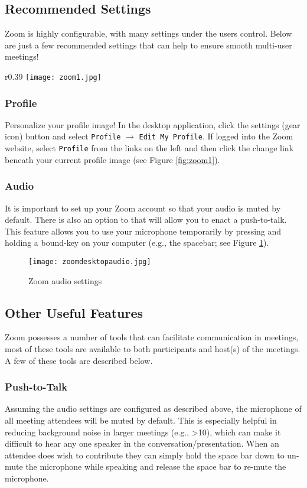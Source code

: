 \subsection{Recommended Settings}
Zoom is highly configurable, with many settings under the users control. Below are just a few recommended settings that can help to ensure smooth multi-user meetings!

    \begin{wrapfigure}[10]{r}{0.39\textwidth}
    \centering
    \texttt{[image: zoom1.jpg]}
    \caption{Zoom profile}
    \label{fig:zoom1}
    \end{wrapfigure}
\noindent    
\subsubsection{Profile}
Personalize your profile image! In the desktop application, click the settings (gear icon) button and select \texttt{Profile} $\rightarrow$ \texttt{Edit My Profile}.  If logged into the Zoom website, select \texttt{Profile} from the links on the left and then click the change link beneath your current profile image (see Figure \ref{fig:zoom1}).

\subsubsection{Audio}
It is important to set up your Zoom account so that your audio is muted by default.  There is also an option to that will allow you to enact a push-to-talk. This feature allows you to use your microphone temporarily by pressing and holding a bound-key on your computer (e.g., the spacebar; see Figure \ref{fig:zoom2}).
    \begin{figure}[h]
    \centering\texttt{[image: zoomdesktopaudio.jpg]}
    \caption{Zoom audio settings}
    \label{fig:zoom2}
    \end{figure}

\subsection{Other Useful Features}
Zoom possesses a number of tools that can facilitate communication in meetings, most of these tools are available to both participants and host(s) of the meetings.  A few of these tools are described below.
\subsubsection{Push-to-Talk}
    Assuming the audio settings are configured as described above, the microphone of all meeting attendees will be muted by default. This is especially helpful in reducing background noise in larger meetings (e.g., >10), which can make it difficult to hear any one speaker in the conversation/presentation.  When an attendee does wish to contribute they can simply hold the space bar down to un-mute the microphone while speaking and release the space bar to re-mute the microphone.
